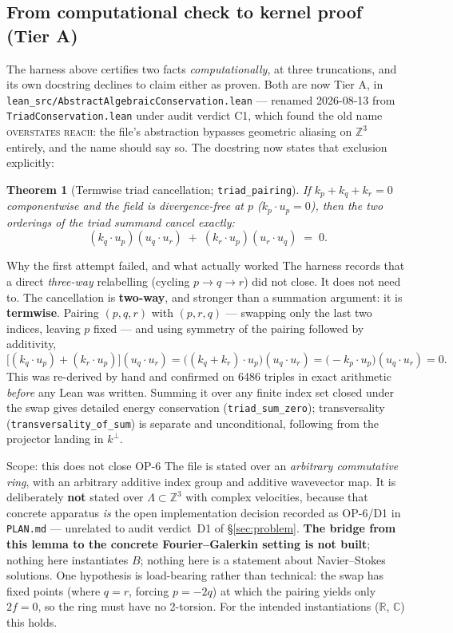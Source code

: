\documentclass[11pt,a4paper]{article}
\newcommand{\tA}{\textcolor{TierA}{\textbf{Tier A}}}
\newcommand{\Z}{\mathbb{Z}}
\newcommand{\R}{\mathbb{R}}
\newcommand{\C}{\mathbb{C}}
\theoremstyle{definition}
\theoremstyle{plain}
\newtheorem{theorem}{Theorem}[section]
\begin{document}
\subsection{From computational check to kernel proof (\tA{})}

The harness above certifies two facts \emph{computationally}, at three truncations, and its own
docstring declines to claim either as proven. Both are now Tier A, in
\texttt{lean\_src/\allowbreak AbstractAlgebraicConservation.lean} --- renamed 2026-08-13 from
\texttt{TriadConservation.lean} under audit verdict C1, which found the old name
\textsc{overstates reach}: the file's abstraction bypasses geometric aliasing on $\Z^3$
entirely, and the name should say so. The docstring now states that exclusion explicitly:

\begin{theorem}[Termwise triad cancellation; \texttt{triad\_pairing}]
If $k_p+k_q+k_r=0$ componentwise and the field is divergence-free at $p$
($k_p\cdot u_p=0$), then the two orderings of the triad summand cancel \emph{exactly}:
\[
(k_q\cdot u_p)(u_q\cdot u_r)\;+\;(k_r\cdot u_p)(u_r\cdot u_q)\;=\;0 .
\]
\end{theorem}

\begin{keybox}{Why the first attempt failed, and what actually worked}
The harness records that a direct \emph{three-way} relabelling (cycling $p\to q\to r$) did not
close. It does not need to. The cancellation is \textbf{two-way}, and stronger than a summation
argument: it is \textbf{termwise}. Pairing $(p,q,r)$ with $(p,r,q)$ --- swapping only the last
two indices, leaving $p$ fixed --- and using symmetry of the pairing followed by additivity,
\[
\bigl[(k_q\cdot u_p)+(k_r\cdot u_p)\bigr](u_q\cdot u_r)
=\bigl((k_q+k_r)\cdot u_p\bigr)(u_q\cdot u_r)
=\bigl(-k_p\cdot u_p\bigr)(u_q\cdot u_r)=0 .
\]
This was re-derived by hand and confirmed on 6486 triples in exact arithmetic \emph{before} any
Lean was written. Summing it over any finite index set closed under the swap gives detailed
energy conservation (\texttt{triad\_sum\_zero}); transversality
(\texttt{transversality\_of\_sum}) is separate and unconditional, following from the projector
landing in $k^\perp$.
\end{keybox}

\begin{warnbox}{Scope: this does not close OP-6}
The file is stated over an \emph{arbitrary commutative ring}, with an arbitrary additive index
group and additive wavevector map. It is deliberately \textbf{not} stated over
$\Lambda\subset\Z^3$ with complex velocities, because that concrete apparatus \emph{is} the open
implementation decision recorded as OP-6/D1 in \texttt{PLAN.md} --- unrelated to audit
verdict~D1 of \S\ref{sec:problem}. \textbf{The bridge from this lemma to the concrete Fourier--Galerkin setting is not
built}; nothing here instantiates $B$; nothing here is a statement about Navier--Stokes
solutions. One hypothesis is load-bearing rather than technical: the swap has fixed points
(where $q=r$, forcing $p=-2q$) at which the pairing yields only $2f=0$, so the ring must have no
2-torsion. For the intended instantiations ($\R$, $\C$) this holds.
\end{warnbox}
\end{document}

